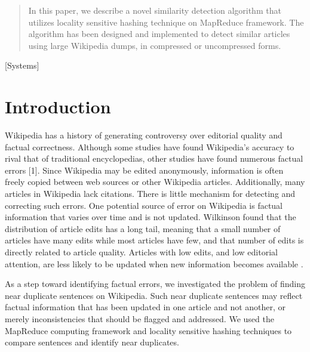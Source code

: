\documentclass{acm_proc_article-sp}
\begin{document}
\date{19 April 2013}


\maketitle
\begin{abstract}
In this paper, we describe a novel similarity detection algorithm that utilizes locality sensitive hashing technique on MapReduce framework. The algorithm has been designed and implemented to detect similar articles using large Wikipedia dumps, in compressed or uncompressed forms.
\end{abstract}

[Systems]



\section{Introduction}
Wikipedia has a history of generating controversy over editorial quality and factual correctness. Although some studies have found Wikipedia’s accuracy to rival that of traditional encyclopedias, other studies have found numerous factual errors [1]. Since Wikipedia may be edited anonymously, information is often freely copied between web sources or other Wikipedia articles. Additionally, many articles in Wikipedia lack citations. There is little mechanism for detecting and correcting such errors. One potential source of error on Wikipedia is factual information that varies over time and is not updated. Wilkinson found that the distribution of article edits has a long tail, meaning that a small number of articles have many edits while most articles have few, and that number of edits is directly related to article quality. Articles with low edits, and low editorial attention, are less likely to be updated when new information becomes available \cite{wilkinson:wiki}.

As a step toward identifying factual errors, we investigated the problem of finding near duplicate sentences on Wikipedia. Such near duplicate sentences may reflect factual information that has been updated in one article and not another, or merely inconsistencies that should be flagged and addressed. We used the MapReduce computing framework and locality sensitive hashing techniques to compare sentences and identify near duplicates.
\end{document}
